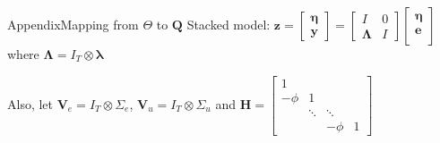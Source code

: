 \documentclass[xcolor=svgnames, 10pt, aspectratio=169]{beamer}
\begin{document}
\begin{frame}{Appendix}{Mapping from $\Theta$ to $\mathbf{Q}$}
\label{app_mapping}
Stacked model: $
    \mathbf{z}
    = 
    \begin{bmatrix}
        \boldsymbol{\eta} \\
        \mathbf{y}
    \end{bmatrix} 
    = 
    \begin{bmatrix}
        I & 0 \\
        \boldsymbol{\Lambda} & I 
    \end{bmatrix}
    \begin{bmatrix}
        \boldsymbol{\eta} \\
        \mathbf{e}\\
    \end{bmatrix}
$ where $\boldsymbol{\Lambda} = I_T \otimes \boldsymbol{\lambda}$

Also, let $\mathbf{V}_e = I_T \otimes \Sigma_e$, $\mathbf{V}_u = I_T \otimes \Sigma_u$ and $
\mathbf{H} = \begin{bmatrix}
        1 &  &  &   \\
        -\phi & 1 &  &  \\
         & \ddots & \ddots &  \\
         &  & -\phi & 1
    \end{bmatrix}
$


\end{frame}
\end{document}
